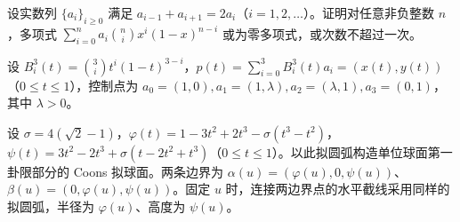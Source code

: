 \newpage
\noindent\begin{minipage}{\textwidth}
设实数列 $\{a_i\}_{i\ge0}$ 满足 $a_{i-1}+a_{i+1}=2a_i$（$i=1,2,\ldots$）。证明对任意非负整数 $n$，多项式 $\sum_{i=0}^{n}a_i\binom ni x^i(1-x)^{n-i}$ 或为零多项式，或次数不超过一次。
\end{minipage}\par\vfill
\noindent\begin{minipage}{\textwidth}
设 $B_i^3(t)=\binom3i t^i(1-t)^{3-i}$，$p(t)=\sum_{i=0}^3B_i^3(t)a_i=(x(t),y(t))$（$0\le t\le1$），控制点为 $a_0=(1,0),a_1=(1,\lambda),a_2=(\lambda,1),a_3=(0,1)$，其中 $\lambda>0$。
\end{minipage}\par\vfill
\noindent\begin{minipage}{\textwidth}
设 $\sigma=4(\sqrt2-1)$，$\varphi(t)=1-3t^2+2t^3-\sigma(t^3-t^2)$，$\psi(t)=3t^2-2t^3+\sigma(t-2t^2+t^3)$（$0\le t\le1$）。以此拟圆弧构造单位球面第一卦限部分的 Coons 拟球面。两条边界为 $\alpha(u)=(\varphi(u),0,\psi(u))$、$\beta(u)=(0,\varphi(u),\psi(u))$。固定 $u$ 时，连接两边界点的水平截线采用同样的拟圆弧，半径为 $\varphi(u)$、高度为 $\psi(u)$。
\end{minipage}\par\vfill
